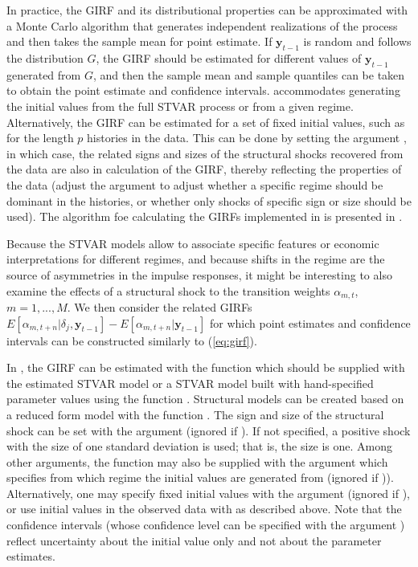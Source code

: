 \documentclass[nojss]{jss}
\begin{document}
In practice, the GIRF and its distributional properties can be approximated with a Monte Carlo algorithm that generates independent realizations of the process and then takes the sample mean for point estimate. If $\boldsymbol{y}_{t-1}$ is random and follows the distribution $G$, the GIRF should be estimated for different values of $\boldsymbol{y}_{t-1}$ generated from $G$, and then the sample mean and sample quantiles can be taken to obtain the point estimate and confidence intervals.  accommodates generating the initial values from the full STVAR process or from a given regime. Alternatively, the GIRF can be estimated for a set of fixed initial values, such as for the length $p$ histories in the data. This can be done by setting the argument , in which case, the related signs and sizes of the structural shocks recovered from the data are also in calculation of the GIRF, thereby reflecting the properties of the data (adjust the argument  to adjust whether a specific regime should be dominant in the histories, or whether only shocks of specific sign or size should be used). The algorithm foe calculating the GIRFs implemented in  is presented in \cite{Lanne+Virolainen:2024}.

Because the STVAR models allow to associate specific features or economic interpretations for different regimes, and because shifts in the regime are the source of asymmetries in the impulse responses, it might be interesting to also examine the effects of a structural shock to the transition weights $\alpha_{m,t}$, $m=1,...,M$. We then consider the related GIRFs $E[\alpha_{m,t+n}|\delta_j,\boldsymbol{y}_{t-1}] - E[\alpha_{m,t+n}|\boldsymbol{y}_{t-1}]$ for which point estimates and confidence intervals can be constructed similarly to (\ref{eq:girf}).

In , the GIRF can be estimated with the function  which should be supplied with the estimated STVAR model or a STVAR model built with hand-specified parameter values using the function . Structural models can be created based on a reduced form model with the function . The sign and size of the structural shock can be set with the argument  (ignored if ). If not specified, a positive shock with the size of one standard deviation is used; that is, the size is one. Among other arguments, the function may also be supplied with the argument  which specifies from which regime the initial values are generated from (ignored if )). Alternatively, one may specify fixed initial values with the argument  (ignored if ), or use initial values in the observed data with  as described above. Note that the confidence intervals (whose confidence level can be specified with the argument ) reflect uncertainty about the initial value only and not about the parameter estimates.
\end{document}
